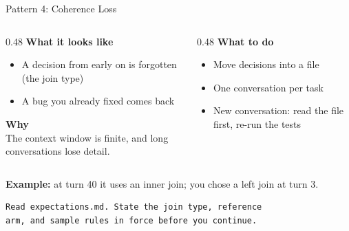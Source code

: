 \documentclass[aspectratio=169, 11pt]{beamer}
\begin{document}
\begin{frame}[fragile]{Pattern 4: Coherence Loss}
  \begin{columns}[T]
    \begin{column}{0.48\textwidth}
      \textbf{What it looks like}
      \begin{itemize}
        \small
        \item A decision from early on is forgotten (the join type)
        \item A bug you already fixed comes back
      \end{itemize}
      \vspace{0.4em}
      \textbf{Why}\\[0.2em]
      {\small The context window is finite, and long conversations lose detail.}
    \end{column}
    \begin{column}{0.48\textwidth}
      \textbf{What to do}
      \begin{itemize}
        \small
        \item Move decisions into a file
        \item One conversation per task
        \item New conversation: read the file first, re-run the tests
      \end{itemize}
    \end{column}
  \end{columns}

  \vspace{0.6em}
  \textbf{Example:} at turn 40 it uses an inner join; you chose a left join at turn 3.

  \vspace{0.3em}
  \begin{lstlisting}[basicstyle=\ttfamily\footnotesize]
Read expectations.md. State the join type, reference
arm, and sample rules in force before you continue.
  \end{lstlisting}
\end{frame}
\end{document}
